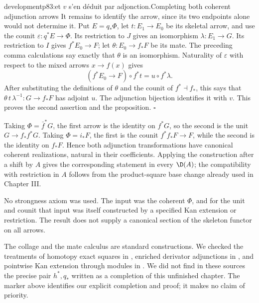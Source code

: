 \begin{dcomment}{development}{p83:et $v$ s'en déduit par adjonction.}{Completing both coherent adjunction arrows}
It remains to identify the arrow, since its two endpoints alone would not determine it. Put \(E=q_*\Phi\), let \(t:E_1\to E_0\) be its skeletal arrow, and use the counit
\(\varepsilon:q^*E\to\Phi\).
Its restriction to \(J\) gives an isomorphism \(\lambda:E_1\to G\). Its restriction to \(I\) gives \(f^*E_0\to F\); let \(\theta:E_0\to f_*F\) be its mate. The preceding comma calculations say exactly that \(\theta\) is an isomorphism. Naturality of \(\varepsilon\) with respect to the mixed arrows \(x\to f(x)\) gives
\[
 (f^*E_0\longrightarrow F)\circ f^*t
 =
 u\circ f^*\lambda.
\]
After substituting the definitions of \(\theta\) and the counit of \(f^*\dashv f_*\), this says that
\(\theta\,t\,\lambda^{-1}:G\to f_*F\)
has adjoint \(u\). The adjunction bijection identifies it with \(v\). This proves the second assertion and the proposition. \(\square\)

Taking \(\Phi=\bar f^*G\), the first arrow is the identity on \(f^*G\), so the second is the unit \(G\to f_*f^*G\). Taking \(\Phi=i_*F\), the first is the counit \(f^*f_*F\to F\), while the second is the identity on \(f_*F\). Hence both adjunction transformations have canonical coherent realizations, natural in their coefficients. Applying the construction after a shift by \(A\) gives the corresponding statement in every \(\D(A)\); the compatibility with restriction in \(A\) follows from the product-square base change already used in Chapter III.

No strongness axiom was used. The input was the coherent \(\Phi\), and for the unit and counit that input was itself constructed by a specified Kan extension or restriction. The result does not supply a canonical section of the skeleton functor on all arrows.

The collage and the mate calculus are standard constructions. We checked the treatments of homotopy exact squares in \citet[Section 1]{Groth2013}, enriched derivator adjunctions in \citet[Sections 8--9]{GrothPontoShulman2014Additivity}, and pointwise Kan extension through modules in \citet[Section 5]{RiehlVerity2017}. We did not find in these sources the precise pair \(h^*,q_*\) written as a completion of this unfinished chapter. The marker above identifies our explicit completion and proof; it makes no claim of priority.
\end{dcomment}

